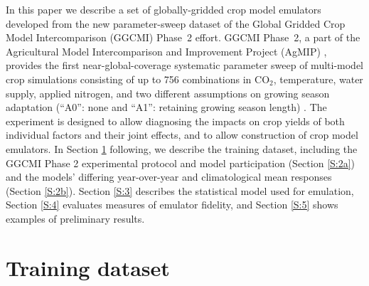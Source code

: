 \documentclass[gmdd]{copernicus} %
\begin{document}
In this paper we describe a set of globally-gridded crop model emulators developed from the new parameter-sweep dataset of the Global Gridded Crop Model Intercomparison (GGCMI) Phase~2 effort. 
GGCMI Phase~2, a part of the Agricultural Model Intercomparison and Improvement Project (AgMIP) \citep{ROSENZWEIG2013, Rosenzweig2014}, provides the first near-global-coverage systematic parameter sweep of multi-model crop simulations consisting of up to 756 combinations in CO$_2$, temperature, water supply, applied nitrogen, and two different assumptions on growing season adaptation (``A0'': none and ``A1'': retaining growing season length) \citep[CTWN-A,][]{franke2020ctwnexperiment,minoli2019adaptation}.
The experiment is designed to allow diagnosing the impacts on crop yields of both individual factors and their joint effects, and to allow construction of crop model emulators.
In Section \ref{S:2} following, we describe the training dataset, including the GGCMI Phase 2 experimental protocol and model participation (Section \ref{S:2a}) and the models' differing year-over-year and climatological mean responses (Section \ref{S:2b}). Section \ref{S:3} describes the statistical model used for emulation, Section \ref{S:4} evaluates measures of emulator fidelity, and Section \ref{S:5} shows examples of preliminary results. 

 
\section{Training dataset}
\label{S:2}
\end{document}

